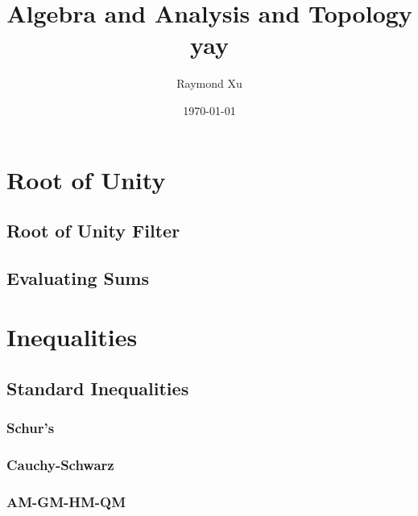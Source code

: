 \documentclass[11pt]{scrartcl}
\theoremstyle{plain} %
\theoremstyle{definition}
\theoremstyle{remark}
\theoremstyle{empty}
\theoremstyle{empty}
\theoremstyle{empty}
\theoremstyle{empty}
\theoremstyle{empty}
\theoremstyle{empty}
\theoremstyle{empty}
\begin{document}



\title{Algebra and Analysis and Topology yay}
\author{Raymond Xu}
\date{\today}
\maketitle

\begin{abstract}
\end{abstract}

\tableofcontents

\eject

\section{Root of Unity}

\subsection{Root of Unity Filter}

\subsection{Evaluating Sums}

\section{Inequalities}

\subsection{Standard Inequalities}

\subsubsection{Schur's}

\subsubsection{Cauchy-Schwarz}

\subsubsection{AM-GM-HM-QM}
\end{document}
